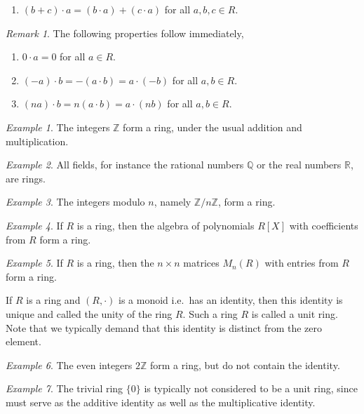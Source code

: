 \documentclass[11pt]{article}
\newcommand{\R}{\mathbb{R}}
\newcommand{\Q}{\mathbb{Q}}
\newcommand{\Z}{\mathbb{Z}}
\theoremstyle{definition}
\theoremstyle{remark}
\newtheorem*{remark}{Remark}
\newtheorem*{example}{Example}
\numberwithin{equation}{section}
\begin{document}
\begin{definition}
\begin{enumerate}
\begin{enumerate}
                \item $(b + c)\cdot a = (b\cdot a) + (c\cdot a)$ for all $a, b, c \in R$.
            \end{enumerate}
        \end{enumerate}
        \begin{remark}
            The following properties follow immediately,
            \begin{enumerate}
                \itemsep0em
                \item $0\cdot a = 0$ for all $a \in R$.
                \item $(-a)\cdot b = -(a\cdot b) = a\cdot(-b)$ for all $a, b \in R$.
                \item $(na)\cdot b = n(a\cdot b) = a\cdot (nb)$ for all $a, b \in R$.
            \end{enumerate}
        \end{remark}
    \end{definition}

    \begin{example}
        The integers $\Z$ form a ring, under the usual addition and multiplication.
    \end{example}
    \begin{example}
        All fields, for instance the rational numbers $\Q$ or the real numbers $\R$,
        are rings.
    \end{example}
    \begin{example}
        The integers modulo $n$, namely $\Z/n\Z$, form a ring.
    \end{example}
    \begin{example}
        If $R$ is a ring, then the algebra of polynomials $R[X]$ with coefficients
        from $R$ form a ring.
    \end{example}
    \begin{example}
        If $R$ is a ring, then the $n \times n$ matrices $M_n(R)$ with entries from
        $R$ form a ring.
    \end{example}

    \begin{definition}
        If $R$ is a ring and $(R, \cdot)$ is a monoid i.e.\ has an identity, then
        this identity is unique and called the unity of the ring $R$. Such a ring $R$
        is called a unit ring. Note that we typically demand that this identity is
        distinct from the zero element.
    \end{definition}
    \begin{example}
        The even integers $2\Z$ form a ring, but do not contain the identity.
    \end{example}
    \begin{example}
        The trivial ring $\{0\}$ is typically not considered to be a unit ring, since
        must serve as the additive identity as well as the multiplicative identity.
    \end{example}
\end{document}
